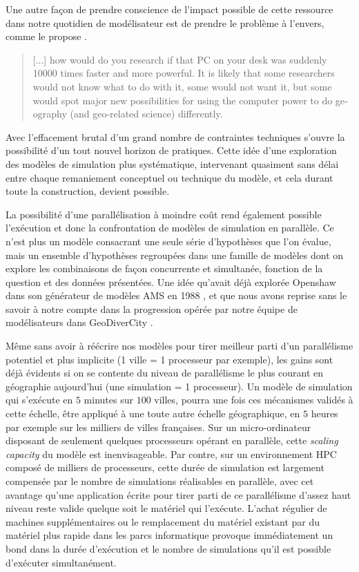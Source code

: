 Une autre façon de prendre conscience de l'impact possible de cette ressource dans notre quotidien de modélisateur est de prendre le problème à l'envers, comme le propose \textcite{Openshaw2000}. \foreignblockquote{english}[\cite{Openshaw2000}]{ [...] how would do you research if that PC on your desk was suddenly 10000 times faster and more powerful. It is likely that some researchers would not know what to do with it, some would not want it, but some would spot major new possibilities for using the computer power to do geography (and geo-related science) differently.}

Avec l'effacement brutal d'un grand nombre de contraintes techniques s'ouvre la possibilité d'un tout nouvel horizon de pratiques. Cette idée d'une exploration des modèles de simulation plus systématique, intervenant quasiment sans délai entre chaque remaniement conceptuel ou technique du modèle, et cela durant toute la construction, devient possible.

La possibilité d'une parallélisation à moindre coût rend également possible l'exécution et donc la confrontation de modèles de simulation en parallèle. Ce n'est plus un modèle consacrant une seule série d'hypothèses que l'on évalue, mais un ensemble d'hypothèses regroupées dans une famille de modèles dont on explore les combinaisons de façon concurrente et simultanée, fonction de la question et des données présentées. Une idée qu'avait déjà explorée Openshaw dans son générateur de modèles AMS en 1988 \autocite{Openshaw1988}, et que nous avons reprise sans le savoir à notre compte dans la progression opérée par notre équipe de modélisateurs dans GeoDiverCity \autocite{Cottineau2014b}.

Même sans avoir à réécrire nos modèles pour tirer meilleur parti d'un parallélisme potentiel et plus implicite (1 ville = 1 processeur par exemple), les gains sont déjà évidents si on se contente du niveau de parallélisme le plus courant en géographie aujourd'hui (une simulation = 1 processeur). Un modèle de simulation qui s’exécute en $5$ minutes sur $100$ villes, pourra une fois ces mécanismes validés à cette échelle, être appliqué à une toute autre échelle géographique, en $5$ heures par exemple sur les milliers de villes françaises. Sur un micro-ordinateur disposant de seulement quelques processeurs opérant en parallèle, cette \textit{scaling capacity} du modèle est inenvisageable. Par contre, sur un environnement HPC composé de milliers de processeurs, cette durée de simulation est largement compensée par le nombre de simulations réalisables en parallèle, avec cet avantage qu'une application écrite pour tirer parti de ce parallélisme d'assez haut niveau reste valide quelque soit le matériel qui l'exécute. L'achat régulier de machines supplémentaires ou le remplacement du matériel existant par du matériel plus rapide dans les parcs informatique provoque immédiatement un bond dans la durée d'exécution et le nombre de simulations qu'il est possible d'exécuter simultanément.

